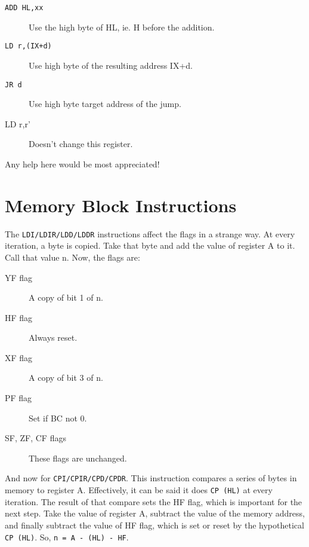 \documentclass[oneside,a4paper]{book}
\begin{document}
\begin{description}

\item[{\tt ADD HL,xx}]
Use the high byte of HL, ie. H before the addition.

\item[{\tt LD r,(IX+d)}]
Use high byte of the resulting address IX+d.

\item[{\tt JR d}]
Use high byte target address of the jump.

\item[{LD r,r'}]
Doesn't change this register.

\end{description}

Any help here would be most appreciated!


\section{Memory Block Instructions \cite{mrison}}
\label{block_mem}

The {\tt LDI/LDIR/LDD/LDDR} instructions affect the flags in a strange way.
At every iteration, a byte is copied. Take that byte and add the value of 
register A to it. Call that value n. Now, the flags are:

\begin{description}
 
\item[YF flag]
  A copy of bit 1 of n.

\item[HF flag]
  Always reset.

\item[XF flag]
  A copy of bit 3 of n.

\item[PF flag]
  Set if BC not 0.

\item[SF, ZF, CF flags]
  These flags are unchanged.

\end{description}

And now for {\tt CPI/CPIR/CPD/CPDR}. This instruction compares a series of
bytes in memory to register A. Effectively, it can be said it does 
{\tt CP (HL)} at every iteration. The result of that compare sets the
HF flag, which is important for the next step. Take the value of register A,
subtract the value of the memory address, and finally subtract the value
of HF flag, which is set or reset by the hypothetical {\tt CP (HL)}. So,
{\tt n = A - (HL) - HF}.
\end{document}
